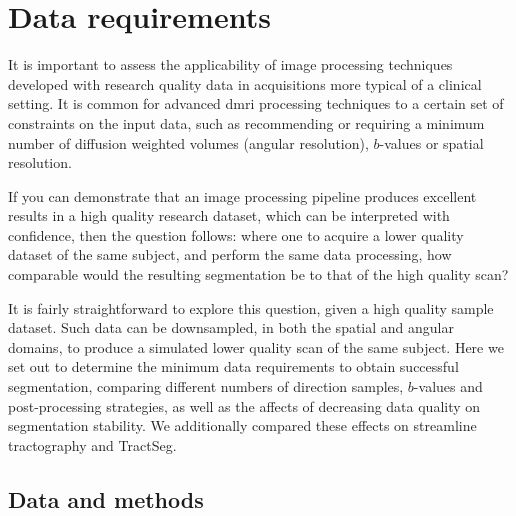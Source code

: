 \section{Data requirements}



It is important to assess the applicability of image processing techniques developed with research quality data in acquisitions more typical of a clinical setting.
It is common for advanced \gls{dmri} processing techniques to  a certain set of constraints on the input data, such as recommending or requiring a minimum number of diffusion weighted volumes (angular resolution), $b$-values or spatial resolution.

If you can demonstrate that an image processing pipeline produces excellent results in a high quality research dataset, which can be interpreted with confidence, then the question follows: where one to acquire a lower quality dataset of the same subject, and perform the same data processing, how comparable would the resulting segmentation be to that of the high quality scan?

It is fairly straightforward to explore this question, given a high quality sample dataset.
Such data can be downsampled, in both the spatial and angular domains, to produce a simulated lower quality scan of the same subject.
Here we set out to determine the minimum data requirements to obtain successful segmentation, comparing different numbers of direction samples, $b$-values and post-processing strategies, as well as the affects of decreasing data quality on segmentation stability.
We additionally compared these effects on streamline tractography and TractSeg.

\subsection{Data and methods}

